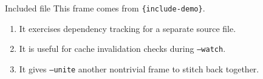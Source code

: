 \begin{frame}{Included file}
  This frame comes from \texttt{\string\{include-demo\}}.

  \begin{enumerate}
    \item It exercises dependency tracking for a separate source file.
    \item It is useful for cache invalidation checks during \texttt{--watch}.
    \item It gives \texttt{--unite} another nontrivial frame to stitch back together.
  \end{enumerate}
\end{frame}